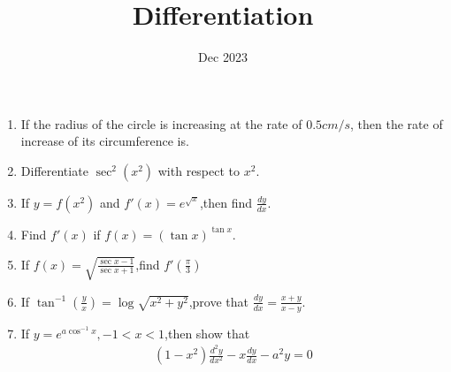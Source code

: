 \documentclass[12pt,-letter paper]{article}
\title{Differentiation}
\date{Dec 2023}
\providecommand{\brak}[1]{\ensuremath{\left(#1\right)}}
\begin{document}
\maketitle
\begin{enumerate}
\item If the radius of the circle is increasing at the rate of $0.5cm/s$, then the rate of increase of its circumference is.

\item Differentiate $\sec^2(x^2)$ with respect to $x^2$.

\item If $y=f(x^2)$ and $f'(x)=e^{\sqrt{x}}$,then find $\frac{dy}{dx}$.

\item Find $f'(x)$ if $f(x)=(\tan x)^{\tan x}$.

\item If $f(x)=\sqrt{\frac{\sec x -1}{\sec x + 1}}$,find $f'\brak{\frac{\pi}{3}}$

\item If $\tan^{-1}{\brak{\frac{y}{x}}}= \log\sqrt{x^2 + y^2}$,prove that $\frac{dy}{dx}=\frac{x+y}{x-y}$.

\item If $y=e^{a \cos^{-1}x},-1<x<1$,then show that
	\begin{align}
	(1-x^2)\frac{d^2y}{dx^2}-x\frac{dy}{dx}-a^2y=0
	\end{align}
\end{enumerate}
\end{document}
